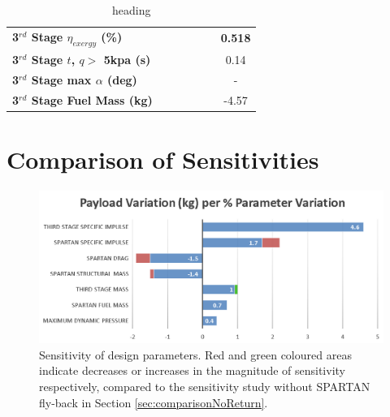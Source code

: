 \begin{table}[ht]
\begin{tabular}{l c c c c c c}
		\\
		\hline 
		\textbf{3$^{rd}$ Stage $\eta_{exergy}$ (\%)}
		& \textbf{\thirddExergyEffISPThreeNinety}
		& \textbf{\thirddExergyEffISPThreeNinetyFive}
		& \textbf{\thirddExergyEffISPThreeStandard}
		& \textbf{\thirddExergyEffISPThreeOneHundredFive}
		& \textbf{\thirddExergyEffISPThreeOneHundredTen}
		& \textbf{0.518}
		\\
		\textbf{3$^{rd}$ Stage $t$, $q >$ 5kpa (s)}
		& \thirdqOverFiveISPThreeNinety
		& \thirdqOverFiveISPThreeNinetyFive
		& \thirdqOverFiveISPThreeStandard
		& \thirdqOverFiveISPThreeOneHundredFive
		& \thirdqOverFiveISPThreeOneHundredTen
		&0.14
		\\
		\textbf{3$^{rd}$ Stage max $\alpha$ (deg)}
		& \thirdmaxAoAISPThreeNinety
		& \thirdmaxAoAISPThreeNinetyFive
		& \thirdmaxAoAISPThreeStandard
		& \thirdmaxAoAISPThreeOneHundredFive
		& \thirdmaxAoAISPThreeOneHundredTen
		& -
		\\
		\textbf{3$^{rd}$ Stage Fuel Mass (kg)}
		& \thirdmFuelISPThreeNinety
		& \thirdmFuelISPThreeNinetyFive
		& \thirdmFuelISPThreeStandard
		& \thirdmFuelISPThreeOneHundredFive
		& \thirdmFuelISPThreeOneHundredTen
		&-4.57
		\\
		\hline 
	\end{tabular} 
	\caption{heading}
	\label{tab:isp3}
\end{table}



\section{Comparison of Sensitivities}

\begin{figure}[th]
	\centering
	\includegraphics[width=0.99\linewidth]{figures/6_FlyBack/BarChart}
	\caption{Sensitivity of design parameters. Red and green coloured areas indicate decreases or increases in the magnitude of sensitivity respectively, compared to the sensitivity study without SPARTAN fly-back in Section \ref{sec:comparisonNoReturn}.}
	\label{fig:BarChartreturn}
\end{figure}

